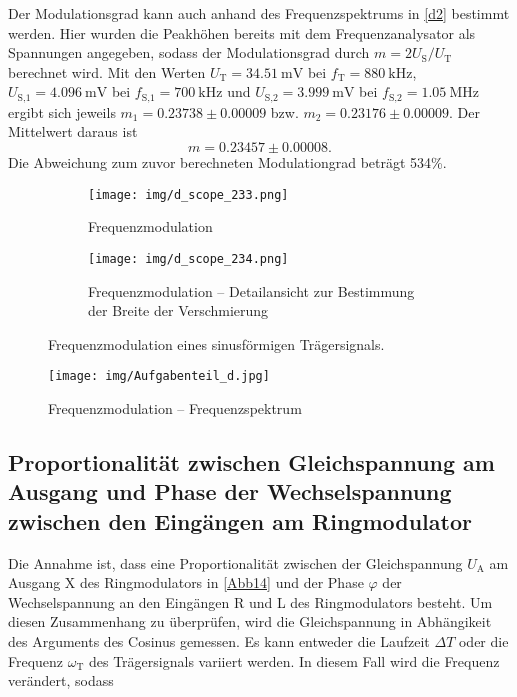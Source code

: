 Der Modulationsgrad kann auch anhand des Frequenzspektrums in \autoref{d2} bestimmt werden. Hier wurden die Peakhöhen bereits mit dem Frequenzanalysator als Spannungen angegeben, sodass der Modulationsgrad durch $m = 2U_\text{S}/U_\text{T}$ berechnet wird. Mit den Werten $U_\text{T} = \SI{34.51}{\milli\volt}$ bei $f_\text{T} = \SI{880}{\kilo\hertz}$, $U_\text{S,1} = \SI{4.096}{\milli\volt}$ bei $f_\text{S,1} = \SI{700}{\kilo\hertz}$ und $U_\text{S,2} = \SI{3.999}{\milli\volt}$ bei $f_\text{S,2} = \SI{1.05}{\mega\hertz}$ ergibt sich jeweils $m_1 = 0.23738 \pm 0.00009$ bzw. $m_2 = 0.23176 \pm 0.00009$. Der Mittelwert daraus ist
\[
m = 0.23457 \pm 0.00008.
\]
Die Abweichung zum zuvor berechneten Modulationgrad beträgt 534\%.

\begin{figure}[t!]
	\centering
	\begin{subfigure}[t]{0.48\textwidth}
		\centering
		\texttt{[image: img/d\_scope\_233.png]}
		\caption{Frequenzmodulation}
	\end{subfigure}\hfill%
	\begin{subfigure}[t]{0.48\textwidth}
		\centering
		\texttt{[image: img/d\_scope\_234.png]}
		\caption{Frequenzmodulation -- Detailansicht zur Bestimmung der Breite der Verschmierung}
	\end{subfigure}
	\caption{Frequenzmodulation eines sinusförmigen Trägersignals.}
	\label{d1}
\end{figure}

\begin{figure}
	\centering
	\texttt{[image: img/Aufgabenteil\_d.jpg]}
	\caption{Frequenzmodulation -- Frequenzspektrum}
	\label{d2}
\end{figure}

\FloatBarrier

\subsection{Proportionalit\"{a}t zwischen Gleichspannung am Ausgang und Phase der Wechselspannung zwischen den Eing\"{a}ngen am Ringmodulator}

Die Annahme ist, dass eine Proportionalität zwischen der Gleichspannung $U_\text{A}$ am Ausgang X des Ringmodulators in \autoref{Abb14} und der Phase $\varphi$ der Wechselspannung an den Eingängen R und L des Ringmodulators besteht. Um diesen Zusammenhang zu überprüfen, wird die Gleichspannung in Abhängikeit des Arguments des Cosinus gemessen. Es kann entweder die Laufzeit $\Delta T$ oder die Frequenz $\omega_\text{T}$ des Trägersignals variiert werden. In diesem Fall wird die Frequenz verändert, sodass


